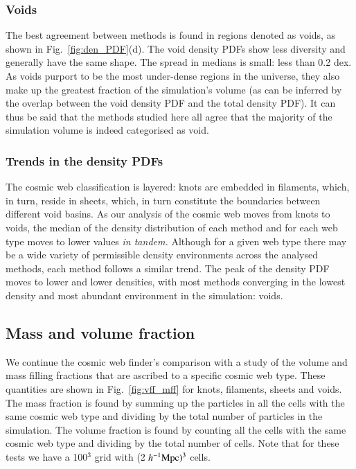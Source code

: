 \documentclass[useAMS,usenatbib]{mnras}
\def\hmpc{~h^{-1}\rm Mpc}
\begin{document}
\subsubsection{Voids}
The best agreement between methods is found in regions denoted as voids, as shown in Fig.~\ref{fig:den_PDF}(d). The void density PDFs show less diversity and generally have the same shape. The spread in medians is small: less than 0.2 dex. As voids purport to be the most under-dense regions in the universe, they also make up the greatest fraction of the simulation's volume (as can be inferred by the overlap between the void density PDF and the total density PDF). It can thus be said that the methods studied here all agree that the majority of the simulation volume is indeed categorised as void.

\subsubsection{Trends in the density PDFs}
The cosmic web classification is layered: knots are embedded in filaments, which, in turn, reside in sheets, which, in turn constitute the boundaries between different void basins. As our analysis of the cosmic web moves from knots to voids, the median of the density distribution of each method and for each web type moves to lower values {\it in tandem.} Although for a given web type there may be a wide variety of permissible density environments across the analysed methods, each method follows a similar trend. The peak of the density PDF moves to lower and lower densities, with most methods converging in the lowest density and most abundant environment in the simulation: voids.

\subsection{Mass and volume fraction}
We continue the cosmic web finder's comparison with a study of the volume and mass filling fractions that are ascribed to a specific cosmic web type. These quantities are shown in Fig.~\ref{fig:vff_mff} for knots, filaments, sheets and voids. The mass fraction is found by summing up the particles in all the cells with the same cosmic web type and dividing by the total number of particles in the simulation. The volume fraction is found by counting all the cells with the same cosmic web type and dividing by the total number of cells. Note that for these tests we have a 100$^3$ grid with (2$\hmpc)^3$ cells.
 
\end{document}
